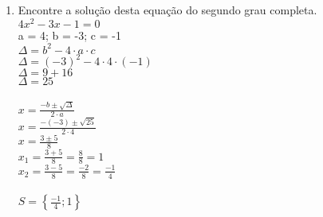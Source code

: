 \documentclass[a4paper,14pt]{article}
\begin{document}
\begin{multicols}{2}
\begin{enumerate}
        \item Encontre a solução desta equação do segundo grau completa.
        \\
        $4x^2 - 3x -1 = 0$ \\
        a = 4; b = -3; c = -1 \\
        $\Delta = b^2 - 4 \cdot a \cdot c$ \\
        $\Delta = (-3)^2 - 4 \cdot 4 \cdot (-1)$ \\
        $\Delta = 9 + 16$ \\
        $\Delta = 25$ \\ \\
        $x = \frac{-b \pm{\sqrt{\Delta}}}{2 \cdot a}$ \\
        $x = \frac{-(-3) \pm{\sqrt{25}}}{2 \cdot 4}$ \\
        $x = \frac{3 \pm{5}}{8}$ \\
        $x_1 = \frac{3 + 5}{8} = \frac{8}{8} = 1$ \\
        $x_2 = \frac{3 - 5}{8} = \frac{-2}{8} = \frac{-1}{4}$\\ \\
        $S = \left \{\frac{-1}{4}; 1 \right \} $
        \vspace{8cm}
        
    \end{enumerate}
	\end{multicols}
\end{document}
